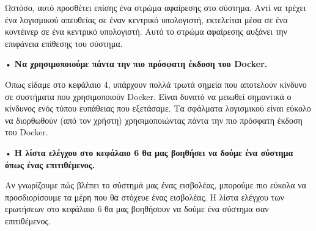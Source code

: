 Ωστόσο, αυτό προσθέτει επίσης ένα στρώμα αφαίρεσης στο σύστημα. Αντί να τρέχει
ένα λογισμικού  απευθείας σε έναν κεντρικό υπολογιστή, εκτελείται μέσα σε ένα
κοντέινερ σε ένα κεντρικό υπολογιστή. Αυτό το στρώμα αφαίρεσης αυξάνει την
επιφάνεια επίθεσης του σύστημα.

• \textbf{Να χρησιμοποιούμε πάντα την πιο πρόσφατη έκδοση του
\textlatin{Docker.}}

Όπως είδαμε στο κεφάλαιο 4, υπάρχουν πολλά τρωτά σημεία που αποτελούν κίνδυνο
σε συστήματα που χρησιμοποιούν \textlatin{Docker}. Είναι δυνατό να μειωθεί
σημαντικά ο κίνδυνος ενός τύπου ευπάθειας που εξετάσαμε. Τα σφάλματα λογισμικού
είναι εύκολο να διορθωθούν (από τον χρήστη) χρησιμοποιώντας πάντα την πιο
πρόσφατη έκδοση του \textlatin{Docker}.

• \textbf{Η λίστα ελέγχου στο κεφάλαιο 6 θα μας βοηθήσει να δούμε ένα σύστημα
όπως ένας επιτιθέμενος.}

Αν γνωρίζουμε πώς βλέπει το σύστημά μας ένας εισβολέας, μπορούμε πιο εύκολα να
προσδιορίσουμε τα μέρη που θα στόχευε ένας εισβολέας. Η λίστα ελέγχου των 
ερωτήσεων στο κεφάλαιο 6 θα μας βοηθήσουν να δούμε ένα σύστημα σαν επιτιθέμενος.

